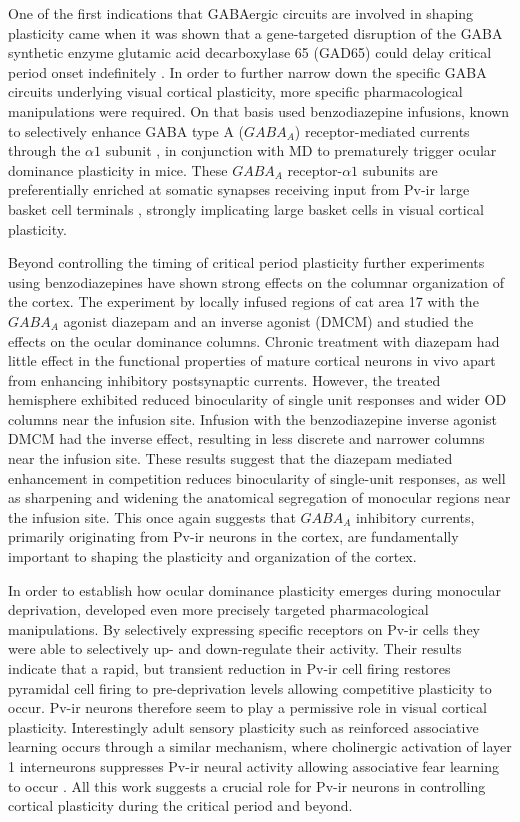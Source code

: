 One of the first indications that GABAergic circuits are involved in
shaping plasticity came when it was shown that a gene-targeted
disruption of the GABA synthetic enzyme glutamic acid decarboxylase 65
(GAD65) could delay critical period onset indefinitely
\citep{Fagiolini2000}. In order to further narrow down the specific
GABA circuits underlying visual cortical plasticity, more specific
pharmacological manipulations were required. On that basis
\cite{Fagiolini2004} used benzodiazepine infusions, known to
selectively enhance GABA type A ($GABA_A$) receptor-mediated currents
through the $\alpha1$ subunit \citep{Rudolph1999}, in conjunction with
MD to prematurely trigger ocular dominance plasticity in mice. These
$GABA_A$ receptor-$\alpha1$ subunits are preferentially enriched at
somatic synapses receiving input from Pv-ir large basket cell
terminals \citep{Klausberger2002}, strongly implicating large basket
cells in visual cortical plasticity.

Beyond controlling the timing of critical period plasticity further
experiments using benzodiazepines have shown strong effects on the
columnar organization of the cortex. The experiment by
\cite{Hensch2004} locally infused regions of cat area 17 with the
$GABA_A$ agonist diazepam and an inverse agonist (DMCM) and studied
the effects on the ocular dominance columns. Chronic treatment with
diazepam had little effect in the functional properties of mature
cortical neurons in vivo apart from enhancing inhibitory postsynaptic
currents. However, the treated hemisphere exhibited reduced
binocularity of single unit responses and wider OD columns near the
infusion site. Infusion with the benzodiazepine inverse agonist DMCM
had the inverse effect, resulting in less discrete and narrower
columns near the infusion site. These results suggest that the
diazepam mediated enhancement in competition reduces binocularity of
single-unit responses, as well as sharpening and widening the
anatomical segregation of monocular regions near the infusion
site. This once again suggests that $GABA_A$ inhibitory currents,
primarily originating from Pv-ir neurons in the cortex, are
fundamentally important to shaping the plasticity and organization of
the cortex.

In order to establish how ocular dominance plasticity emerges during
monocular deprivation, \cite{Kuhlman2013} developed even more
precisely targeted pharmacological manipulations. By selectively
expressing specific receptors on Pv-ir cells they were able to
selectively up- and down-regulate their activity. Their results
indicate that a rapid, but transient reduction in Pv-ir cell firing
restores pyramidal cell firing to pre-deprivation levels allowing
competitive plasticity to occur. Pv-ir neurons therefore seem to play
a permissive role in visual cortical plasticity. Interestingly adult
sensory plasticity such as reinforced associative learning occurs
through a similar mechanism, where cholinergic activation of layer 1
interneurons suppresses Pv-ir neural activity allowing associative
fear learning to occur \citep{Letzkus2011}. All this work suggests a
crucial role for Pv-ir neurons in controlling cortical plasticity
during the critical period and beyond.

